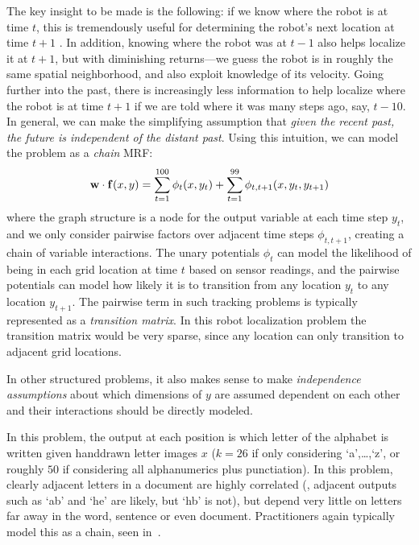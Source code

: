 The key insight to be made is the following: if we know where the robot is at 
time $t$, this is tremendously useful for determining the robot's next location 
at time $t+1$ .  In addition, knowing where the robot was at $t-1$ also helps 
localize it at $t+1$, but with diminishing returns---we guess the robot is in 
roughly the same spatial neighborhood, and also exploit knowledge of its 
velocity.  Going further into the past, there is increasingly less information 
to help localize where the robot is at time $t+1$ if we are told where it was 
many steps ago, say, $t-10$.  In general, we can make the simplifying 
assumption that {\em given the recent past, the future is independent of the 
distant past}.  Using this intuition, we can model the problem as a {\em chain} 
MRF:
\begin{equation}
\mathbf{w} \cdot \mathbf{f}(x,y) = \sum_{t=1}^{100} \phi_t(x,y_t) + \sum_{t=1}^{99} 
\phi_{t,t+1}(x,y_t,y_{t+1})
\end{equation}
where the graph structure is a node for the output variable at each time step 
$y_t$, and we only consider pairwise factors over adjacent time steps 
$\phi_{t,t+1}$, creating a chain of variable interactions.  The unary 
potentials $\phi_t$ can model the likelihood of being in each grid location at 
time $t$ based on sensor readings, and the pairwise potentials can model how 
likely it is to transition from any location $y_t$ to any location $y_{t+1}$.  
The pairwise term in such tracking problems is typically represented as a {\em 
transition matrix}.  In this robot localization problem the transition matrix 
would be very sparse, since any location can only transition to adjacent grid 
locations.


In other structured problems, it also makes sense to make {\em independence 
assumptions} about which dimensions of $y$ are assumed dependent on each other and their interactions should be directly modeled. 

 In this problem, the output at each position is 
which letter of the alphabet is written given handdrawn letter images $x$ 
($k=26$ if only considering `a',\ldots,`z', or roughly $50$ if considering all 
alphanumerics plus punctiation).  In this problem, clearly adjacent letters in 
a document are highly correlated (\eg, adjacent outputs such as `ab' and `he' 
are likely, but `hb' is not), but depend very little on letters far away in the 
word, sentence or even document.  Practitioners again typically model this as a 
chain, seen in~.

